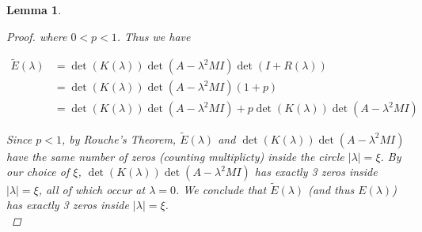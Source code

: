 \documentclass[12pt]{article}
\newtheorem{lemma}{Lemma}
\begin{document}
\begin{lemma}
\begin{proof}
where $0 < p < 1$. Thus we have

\begin{align*}
\tilde{E}(\lambda) &= \det(K(\lambda))\det(A - \lambda^2 MI)\det(I + R(\lambda)) \\
&= \det(K(\lambda))\det(A - \lambda^2 MI)(1 + p) \\
&= \det(K(\lambda))\det(A - \lambda^2 MI) + p \det(K(\lambda))\det(A - \lambda^2 MI)
\end{align*}

Since $p < 1$, by Rouche's Theorem, $\tilde{E}(\lambda)$ and $\det(K(\lambda))\det(A - \lambda^2 MI)$ have the same number of zeros (counting multiplicty) inside the circle $|\lambda| = \xi$. By our choice of $\xi$, $\det(K(\lambda))\det(A - \lambda^2 MI)$ has exactly 3 zeros inside $|\lambda| = \xi$, all of which occur at $\lambda = 0$. We conclude that $\tilde{E}(\lambda)$ (and thus $E(\lambda)$) has exactly 3 zeros inside $|\lambda| = \xi$.\\

\end{proof}
\end{lemma}
\end{document}
